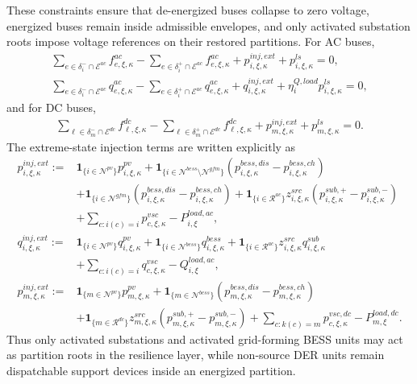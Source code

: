 These constraints ensure that de-energized buses collapse to zero voltage, energized buses remain inside admissible envelopes, and only activated substation roots impose voltage references on their restored partitions. For AC buses,
\begin{align}
\sum_{e\in\delta_i^{-}\cap\mathcal{E}^{ac}} f_{e,\xi,\kappa}^{ac}
- \sum_{e\in\delta_i^{+}\cap\mathcal{E}^{ac}} f_{e,\xi,\kappa}^{ac}
+ p_{i,\xi,\kappa}^{inj,ext}
+ p_{i,\xi,\kappa}^{ls}
= 0,
\label{eq:10b-ext-ac-balance}\\
\sum_{e\in\delta_i^{-}\cap\mathcal{E}^{ac}} q_{e,\xi,\kappa}^{ac}
- \sum_{e\in\delta_i^{+}\cap\mathcal{E}^{ac}} q_{e,\xi,\kappa}^{ac}
+ q_{i,\xi,\kappa}^{inj,ext}
+ \eta_i^{Q,load} p_{i,\xi,\kappa}^{ls}
= 0,
\label{eq:10b-ext-ac-reactive-balance}
\end{align}
and for DC buses,
\begin{align}
\sum_{\ell\in\delta_m^{-}\cap\mathcal{E}^{dc}} f_{\ell,\xi,\kappa}^{dc}
- \sum_{\ell\in\delta_m^{+}\cap\mathcal{E}^{dc}} f_{\ell,\xi,\kappa}^{dc}
+ p_{m,\xi,\kappa}^{inj,ext}
+ p_{m,\xi,\kappa}^{ls}
= 0.
\label{eq:10b-ext-dc-balance}
\end{align}
The extreme-state injection terms are written explicitly as
\begin{align}
p_{i,\xi,\kappa}^{inj,ext} :=
&\mathbf{1}_{\{i\in\mathcal{N}^{pv}\}}p_{i,\xi,\kappa}^{pv}
+ \mathbf{1}_{\{i\in\mathcal{N}^{bess}\setminus\mathcal{N}^{gfm}\}}
\left(p_{i,\xi,\kappa}^{bess,dis}-p_{i,\xi,\kappa}^{bess,ch}\right) \\
&+ \mathbf{1}_{\{i\in\mathcal{N}^{gfm}\}}
\left(p_{i,\xi,\kappa}^{bess,dis}-p_{i,\xi,\kappa}^{bess,ch}\right)
+ \mathbf{1}_{\{i\in\mathcal{R}^{ac}\}} z_{i,\xi,\kappa}^{src}
\left(p_{i,\xi,\kappa}^{sub,+}-p_{i,\xi,\kappa}^{sub,-}\right) \\
&+ \sum_{c:i(c)=i} p_{c,\xi,\kappa}^{vsc}
- P_{i,\xi}^{load,ac},
\label{eq:10b-ext-ac-net-injection}\\
q_{i,\xi,\kappa}^{inj,ext} :=
&\mathbf{1}_{\{i\in\mathcal{N}^{pv}\}}q_{i,\xi,\kappa}^{pv}
+ \mathbf{1}_{\{i\in\mathcal{N}^{bess}\}}q_{i,\xi,\kappa}^{bess}
+ \mathbf{1}_{\{i\in\mathcal{R}^{ac}\}} z_{i,\xi,\kappa}^{src} q_{i,\xi,\kappa}^{sub} \\
&+ \sum_{c:i(c)=i} q_{c,\xi,\kappa}^{vsc}
- Q_{i,\xi}^{load,ac},
\label{eq:10b-ext-ac-reactive-net-injection}\\
p_{m,\xi,\kappa}^{inj,ext} :=
&\mathbf{1}_{\{m\in\mathcal{N}^{pv}\}}p_{m,\xi,\kappa}^{pv}
+ \mathbf{1}_{\{m\in\mathcal{N}^{bess}\}}
\left(p_{m,\xi,\kappa}^{bess,dis}-p_{m,\xi,\kappa}^{bess,ch}\right) \\
&+ \mathbf{1}_{\{m\in\mathcal{R}^{dc}\}} z_{m,\xi,\kappa}^{src}
\left(p_{m,\xi,\kappa}^{sub,+}-p_{m,\xi,\kappa}^{sub,-}\right)
+ \sum_{c:k(c)=m} p_{c,\xi,\kappa}^{vsc,dc}
- P_{m,\xi}^{load,dc}.
\label{eq:10b-ext-dc-net-injection}
\end{align}
Thus only activated substations and activated grid-forming BESS units may act as partition roots in the resilience layer, while non-source DER units remain dispatchable support devices inside an energized partition.

